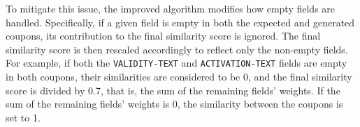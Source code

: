 \documentclass[licencjacka,en]{pracamgr}
\begin{document}
\begin{appendices}
To mitigate this issue, the improved algorithm modifies how empty fields are handled. Specifically, if a given field is empty in both the expected and generated coupons, its contribution to the final similarity score is ignored. The final similarity score is then rescaled accordingly to reflect only the non-empty fields. For example, if both the \texttt{VALIDITY-TEXT} and \texttt{ACTIVATION-TEXT} fields are empty in both coupons, their similarities are considered to be 0, and the final similarity score is divided by 0.7, that is, the sum of the remaining fields' weights. If the sum of the remaining fields' weights is 0, the similarity between the coupons is set to 1.

\end{appendices}

\end{document}
